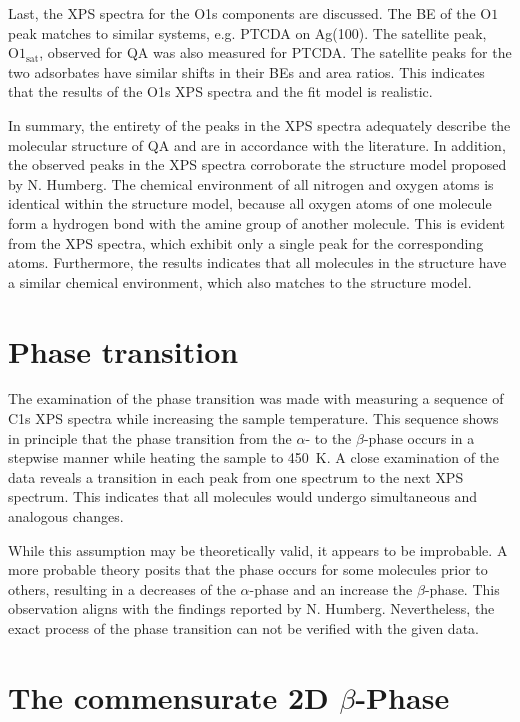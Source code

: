 Last, the \ac{XPS} spectra for the O1s components are discussed. The \ac{BE} of the $\mathrm{O1}$ peak matches to similar systems, e.g. \ac{PTCDA} on Ag(100).\autocite{Bauer2014} The satellite peak, $\mathrm{O1_{sat}}$, observed for \ac{QA} was also measured for \ac{PTCDA}. The satellite peaks for the two adsorbates have similar shifts in their \acp{BE} and area ratios. This indicates that the results of the O1s \ac{XPS} spectra and the fit model is realistic.

In summary, the entirety of the peaks in the \ac{XPS} spectra adequately describe the molecular structure of \ac{QA} and are in accordance with the literature. In addition, the observed peaks in the \ac{XPS} spectra corroborate the structure model proposed by N. Humberg.\autocite{Humberg2024} The chemical environment of all nitrogen and oxygen atoms is identical within the structure model, because all oxygen atoms of one molecule form a hydrogen bond with the amine group of another molecule. This is evident from the \ac{XPS} spectra, which exhibit only a single peak for the corresponding atoms. Furthermore, the results indicates that all molecules in the structure have a similar chemical environment, which also matches to the structure model.

\section{Phase transition}

The examination of the phase transition was made with measuring a sequence of C1s \ac{XPS} spectra while increasing the sample temperature. This sequence shows in principle that the phase transition from the $\alpha$- to the $\beta$-phase occurs in a stepwise manner while heating the sample to 450~\si{K}. A close examination of the data reveals a transition in each peak from one spectrum to the next \ac{XPS} spectrum. This indicates that all molecules would undergo simultaneous and analogous changes.

While this assumption may be theoretically valid, it appears to be improbable. A more probable theory posits that the phase occurs for some molecules prior to others, resulting in a decreases of the $\alpha$-phase and an increase the $\beta$-phase. This observation aligns with the findings reported by N. Humberg.\autocite{Humberg2024} Nevertheless, the exact process of the phase transition can not be verified with the given data.

\section{The commensurate 2D \texorpdfstring{$\beta$}{beta}-Phase}

